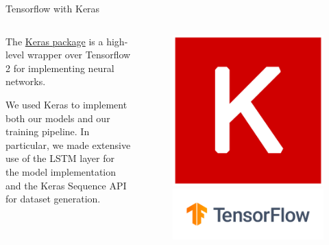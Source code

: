 \documentclass{beamer}
\newcommand{\<}				{\langle}
\renewcommand{\>}      		{\rangle}
\begin{document}
\begin{frame}{Tensorflow with Keras} 
\begin{columns}
\begin{column}{0.47\textwidth}
The \href{https://keras.io/about/}{Keras package} is a high-level wrapper over Tensorflow 2 for implementing neural networks.

\medskip

We used Keras to implement both our models and our training pipeline. In particular, we made extensive use of the LSTM layer for the model implementation and the Keras Sequence API for dataset generation.

\end{column}
\begin{column}{0.47\textwidth}

\begin{figure}[h]
\includegraphics[scale=0.08]{keras.png}
\includegraphics[scale=0.2]{tensorflow.png}
\end{figure}

\end{column}
\end{columns}
\end{frame}
\end{document}
